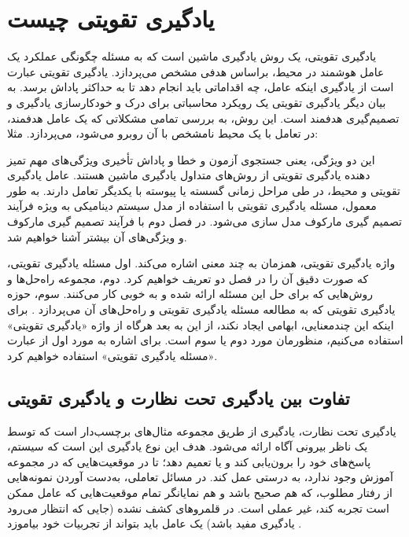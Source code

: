 \section{یادگیری تقویتی چیست}
یادگیری تقویتی، یک روش یادگیری ماشین است که  به مسئله چگونگی عملکرد یک عامل هوشمند  در محیط، براساس هدفی مشخص می‌پردازد. یادگیری تقویتی عبارت است از یادگیری اینکه عامل، چه اقداماتی باید انجام دهد تا به حداکثر پاداش برسد. به بیان دیگر یادگیری تقویتی یک رویکرد محاسباتی برای درک و خودکار‌سازی یادگیری و تصمیم‌گیری هدفمند است. این روش، به بررسی تمامی‌ مشکلاتی که یک عامل هدفمند، در تعامل با یک محیط نامشخص با آن روبرو می‌شود، می‌پردازد. مثلا:



 
 

این دو ویژگی،  یعنی جستجوی آزمون و خطا و پاداش تأخیری ویژگی‌های مهم تمیز دهنده یادگیری تقویتی از روش‌های متداول یادگیری ماشین هستند.
 عامل یادگیری تقویتی و محیط، در طی مراحل زمانی گسسته یا پیوسته با یکدیگر تعامل دارند. به طور معمول، مسئله یادگیری تقویتی با استفاده از مدل سیستم دینامیکی به ویژه فرآیند تصمیم گیری مارکوف مدل سازی می‌شود. در فصل دوم با فرآیند تصمیم گیری مارکوف و ویژگی‌های آن بیشتر آشنا خواهیم شد.

واژه یادگیری تقویتی، همزمان به چند معنی اشاره می‌کند. اول مسئله یادگیری تقویتی، که صورت دقیق آن را در فصل دو تعریف خواهیم کرد. دوم، مجموعه راه‌حل‌ها و روش‌هایی که برای حل این مسئله ارائه شده و به خوبی کار می‌کنند. سوم، حوزه یادگیری تقویتی که به مطالعه مسئله یادگیری تقویتی و راه‌حل‌های آن می‌پردازد
\cite{suttonbook}.
 برای اینکه این چندمعنایی، ابهامی ایجاد نکند، از این به بعد هرگاه از واژه «یادگیری تقویتی» استفاده می‌کنیم، منظورمان  مورد دوم یا سوم است. برای اشاره به مورد اول از عبارت «مسئله یادگیری تقویتی» استفاده خواهیم کرد. 
\subsection*{تفاوت بین یادگیری تحت نظارت و یادگیری تقویتی}
یادگیری تحت نظارت، یادگیری از طریق مجموعه مثال‌های برچسب‌دار است که توسط یک ناظر بیرونی آگاه ارائه می‌شود. هدف این نوع یادگیری این است که سیستم، پاسخ‌های خود را برون‌یابی کند و یا تعمیم دهد؛ تا در موقعیت‌هایی که در مجموعه آموزش وجود ندارد، به درستی عمل کند. در مسائل تعاملی، به‌دست آوردن نمونه‌هایی از رفتار مطلوب، که هم صحیح باشد و هم نمایانگر تمام موقعیت‌هایی که عامل ممکن است تجربه کند، غیر عملی است. در قلمروهای کشف نشده (جایی که انتظار می‌رود یادگیری مفید باشد) یک عامل باید بتواند از تجربیات خود بیاموزد
\cite{suttonbook}.
